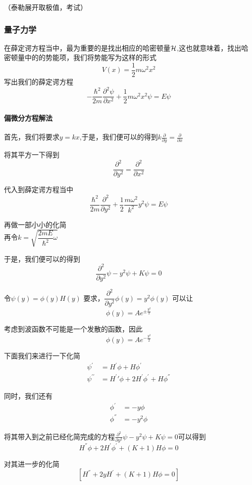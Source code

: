 \documentclass{article}
\begin{document}
（泰勒展开取极值，考试）
\subsubsection{量子力学}
在薛定谔方程当中，最为重要的是找出相应的哈密顿量$\cal H$,这也就意味着，找出哈密顿量中的的势能项，我们将势能写为这样的形式
\[
	V(x)=\frac{1}{2}m\omega^2x^2
\]
写出我们的薛定谔方程
\[
	-\frac{\hbar^2}{2m}\frac{\partial^2\psi}{\partial x^2}+\frac{1}{2}m\omega^2x^2\psi=E\psi
\]

\paragraph{偏微分方程解法}
首先，我们将要求$y=kx$,于是，我们便可以的得到$k\frac{\partial}{\partial y}=\frac{\partial}{\partial x}$

将其平方一下得到
\[
	\frac{\partial^2}{\partial y^2}=\frac{\partial^2}{\partial x^2}
\]

代入到薛定谔方程当中
\[
	\frac{\hbar^2}{2m}\frac{\partial^2}{\partial y^2}+\frac{1}{2}\frac{m\omega^2}{k^2}y^2\psi=E\psi
\]

再做一部小小的化简\\

再令$k=\sqrt{\dfrac{2mE}{\hbar^2}\omega}$

于是，我们便可以的得到
\[\frac{\partial^2}{\partial y^2} \psi -y^2\psi+K\psi=0\]

令$\psi(y)=\phi(y)H(y)$
要求，$\displaystyle \dfrac{\partial^2}{\partial y^2}\phi(y)=y^2\phi(y)$
可以让
\[\phi(y)=Ae^{\pm \frac{y^2}{2}}\]

考虑到波函数不可能是一个发散的函数，因此
\[\phi(y)=Ae^{- \frac{y^2}{2}}\]

下面我们来进行一下化简
\begin{align*}
	\psi^{\prime}       & =H^\prime\phi+H\phi^\prime                    \\
	\psi^{\prime\prime} & =H^\prime\prime\phi+2H^{'}\phi^{'}+H\phi^{''}
\end{align*}

同时，我们还有
\begin{align*}
	\phi^{'}  & =-y\phi   \\
	\phi^{''} & =-y^2\phi
\end{align*}

将其带入到之前已经化简完成的方程$\displaystyle \frac{\partial^2}{\partial y^2} \psi -y^2\psi+K\psi=0$可以得到
\[H^{''}\phi+2H^{'}\phi^{'}+(K+1)H\phi=0\]

对其进一步的化简
\[\left[H^{''}+2yH^{'}+(K+1)H\phi=0\right]\]
\end{document}
